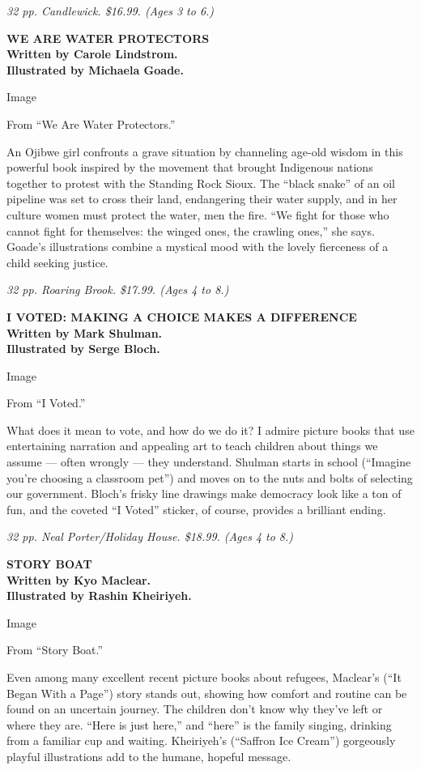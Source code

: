 \emph{32 pp. Candlewick. \$16.99. (Ages 3 to 6.)}

\textbf{WE ARE WATER PROTECTORS}\\
\textbf{Written by Carole Lindstrom.}\\
\textbf{Illustrated by Michaela Goade.}

Image

From ``We Are Water Protectors.''

An Ojibwe girl confronts a grave situation by channeling age-old wisdom
in this powerful book inspired by the movement that brought Indigenous
nations together to protest with the Standing Rock Sioux. The ``black
snake'' of an oil pipeline was set to cross their land, endangering
their water supply, and in her culture women must protect the water, men
the fire. ``We fight for those who cannot fight for themselves: the
winged ones, the crawling ones,'' she says. Goade's illustrations
combine a mystical mood with the lovely fierceness of a child seeking
justice.

\emph{32 pp. Roaring Brook. \$17.99. (Ages 4 to 8.)}

\textbf{I VOTED: MAKING A CHOICE MAKES A DIFFERENCE}\\
\textbf{Written by Mark Shulman.}\\
\textbf{Illustrated by Serge Bloch.}

Image

From ``I Voted.''

What does it mean to vote, and how do we do it? I admire picture books
that use entertaining narration and appealing art to teach children
about things we assume --- often wrongly --- they understand. Shulman
starts in school (``Imagine you're choosing a classroom pet'') and moves
on to the nuts and bolts of selecting our government. Bloch's frisky
line drawings make democracy look like a ton of fun, and the coveted ``I
Voted'' sticker, of course, provides a brilliant ending.

\emph{32 pp. Neal Porter/Holiday House. \$18.99. (Ages 4 to 8.)}

\textbf{STORY BOAT}\\
\textbf{Written by Kyo Maclear.}\\
\textbf{Illustrated by Rashin Kheiriyeh.}

Image

From ``Story Boat.''

Even among many excellent recent picture books about refugees, Maclear's
(``It Began With a Page'') story stands out, showing how comfort and
routine can be found on an uncertain journey. The children don't know
why they've left or where they are. ``Here is just here,'' and ``here''
is the family singing, drinking from a familiar cup and waiting.
Kheiriyeh's (``Saffron Ice Cream'') gorgeously playful illustrations add
to the humane, hopeful message.

